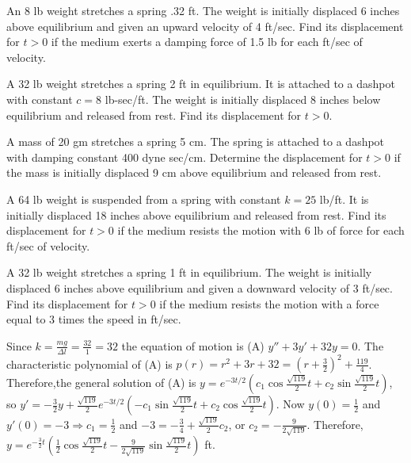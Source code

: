 \documentclass{ximera}
\begin{document}
\begin{problem}\label{exer:6.2.6}
An 8 lb weight stretches a spring .32 ft. The weight is initially
displaced 6 inches above equilibrium and given an upward velocity of 4
ft/sec. Find its displacement for $t>0$ if the medium exerts a
damping force of 1.5 lb for each ft/sec of velocity.
\end{problem}

\begin{problem}\label{exer:6.2.7}
A 32 lb weight stretches a spring 2 ft in equilibrium. It is attached
to a dashpot with constant $c=8$ lb-sec/ft. The weight is initially
displaced 8 inches below equilibrium and released from rest. Find its
displacement for $t>0$.
\end{problem}

\begin{problem}\label{exer:6.2.8}
  A mass of 20 gm stretches a  spring 5 cm.  The spring
is attached to a dashpot with damping constant 400 dyne sec/cm.  Determine
the displacement for $t>0$ if the mass is  initially displaced
 9 cm  above equilibrium  and released from rest.
\end{problem}

\begin{problem}\label{exer:6.2.9}
A 64 lb weight is suspended from a spring with constant $k=25$ lb/ft.
It is initially displaced 18 inches above equilibrium and released
from rest. Find its displacement for $t>0$ if the medium resists the
motion with 6 lb of force for each ft/sec of velocity.
\end{problem}

\begin{problem}\label{exer:6.2.10}
A 32 lb weight stretches a spring 1 ft in equilibrium. The weight is
initially displaced 6 inches above equilibrium and given a downward
velocity of 3 ft/sec. Find its displacement for $t>0$ if the medium
resists the motion with a force  equal to 3 times the speed
in ft/sec.

\begin{solution}
Since $k=\frac{mg}{\Delta l}=\frac{32}{1}=32$ the equation of
motion is (A) $y''+3y'+32y=0$. The characteristic polynomial of (A) is
$p(r)=r^2+3r+32=\left(r+\frac{3}{2}\right)^2+\frac{119}{4}$.
Therefore,the general solution of (A) is
$y=e^{-3t/2}\left(c_1\cos\frac{\sqrt{119}}{2}t
+c_2\sin\frac{\sqrt{119}}{2}t\right)$, so $y'=-\frac{3}{2}y+
\frac{\sqrt{119}}{2}e^{-3t/2}
\left(-c_1\sin\frac{\sqrt{119}}{2}t+c_2\cos\frac{\sqrt{119}}{2}t\right)$.
Now $y(0)=\frac{1}{2}$ and $y'(0)=-3\Rightarrow c_1=\frac{1}{2}$
and $-3=-\frac{3}{4}+\frac{\sqrt{119}}{2}c_2$, or
$c_2=-\frac{9}{2\sqrt{119}}$. Therefore,
$y=e^{-\frac{3}{2}t}\left(\frac{1}{2}\cos \frac{\sqrt{119}}{2} t
-\frac{9}{2\sqrt{119}}\sin\frac{\sqrt{119}}{2}t\right)$ ft.
\end{solution}
\end{problem}
\end{document}
